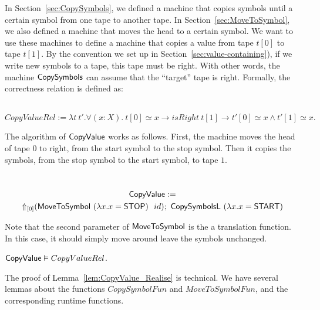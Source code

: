 In Section~\ref{sec:CopySymbols}, we defined a machine that copies symbols until a certain symbol from one tape to another tape.  In
Section~\ref{sec:MoveToSymbol}, we also defined a machine that moves the head to a certain symbol.  We want to use these machines to define a machine
that copies a value from tape $t[0]$ to tape $t[1]$.  By the convention we set up in Section~\ref{sec:value-containing}), if we write new symbols to a
tape, this tape must be right.  With other words, the machine $\MS{CopySymbols}$ can assume that the ``target'' tape is right.  Formally, the
correctness relation is defined as:
\begin{definition}
  \label{def:CopyValue_Rel}
  ~
  \[
    CopyValueRel := \lambda t~t'. \forall (x:X).~t[0] \simeq x \rightarrow isRight~t[1] \rightarrow t'[0] \simeq x \land t'[1] \simeq x.
  \]
\end{definition}

The algorithm of $\MS{CopyValue}$ works as follows.  First, the machine moves the head of tape $0$ to right, from the start symbol to the stop symbol.
Then it copies the symbols, from the stop symbol to the start symbol, to tape $1$.

\begin{definition}[$\MS{CopyValue}$]
  \label{def:CopyValue}
  ~
  \begin{multline*}
    \MS{CopyValue} := \\
    \LiftTapes{(\MS{MoveToSymbol}~(\lambda x. x=\MS{STOP})~~id)}{\Vector{0}}
    \Seq
    \MS{CopySymbolsL}~(\lambda x. x=\MS{START})
  \end{multline*}
\end{definition}

Note that the second parameter of $\MS{MoveToSymbol}$ is the a translation function.  In this case, it should simply move around leave the symbols
unchanged.

\begin{lemma}
  \label{lem:CopyValue_Realise}
  $\MS{CopyValue} \Realise CopyValueRel$.
\end{lemma}

The proof of Lemma~\ref{lem:CopyValue_Realise} is technical.  We have several lemmas about the functions $CopySymbolFun$ and $MoveToSymbolFun$, and
the corresponding runtime functions.

